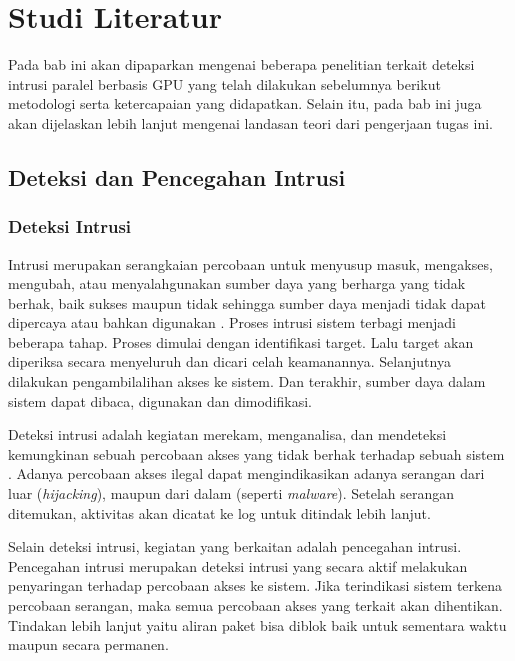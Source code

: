
\chapter{Studi Literatur}

  Pada bab ini akan dipaparkan mengenai beberapa penelitian terkait deteksi intrusi paralel berbasis GPU yang telah dilakukan sebelumnya berikut metodologi serta ketercapaian yang didapatkan. Selain itu, pada bab ini juga akan dijelaskan lebih lanjut mengenai landasan teori dari pengerjaan tugas ini.


\section{Deteksi dan Pencegahan Intrusi}

  \subsection{Deteksi Intrusi}

    Intrusi merupakan serangkaian percobaan untuk menyusup masuk, mengakses, mengubah, atau menyalahgunakan sumber daya yang berharga yang tidak berhak, baik sukses maupun tidak sehingga sumber daya menjadi tidak dapat dipercaya atau bahkan digunakan \citep{kizza2015}. Proses intrusi sistem terbagi menjadi beberapa tahap. Proses dimulai dengan identifikasi target. Lalu target akan diperiksa secara menyeluruh dan dicari celah keamanannya. Selanjutnya dilakukan pengambilalihan akses ke sistem. Dan terakhir, sumber daya dalam sistem dapat dibaca, digunakan dan dimodifikasi. 

    Deteksi intrusi adalah kegiatan merekam, menganalisa, dan mendeteksi kemungkinan sebuah percobaan akses yang tidak berhak terhadap sebuah sistem \citep{kizza2015}. Adanya percobaan akses ilegal dapat mengindikasikan adanya serangan dari luar (\emph{hijacking}), maupun dari dalam (seperti \emph{malware}). Setelah serangan ditemukan, aktivitas akan dicatat ke log untuk ditindak lebih lanjut.

    Selain deteksi intrusi, kegiatan yang berkaitan adalah pencegahan intrusi. Pencegahan intrusi merupakan deteksi intrusi yang secara aktif melakukan penyaringan terhadap percobaan akses ke sistem. Jika terindikasi sistem terkena percobaan serangan, maka semua percobaan akses yang terkait akan dihentikan. Tindakan lebih lanjut yaitu aliran paket bisa diblok baik untuk sementara waktu maupun secara permanen.

